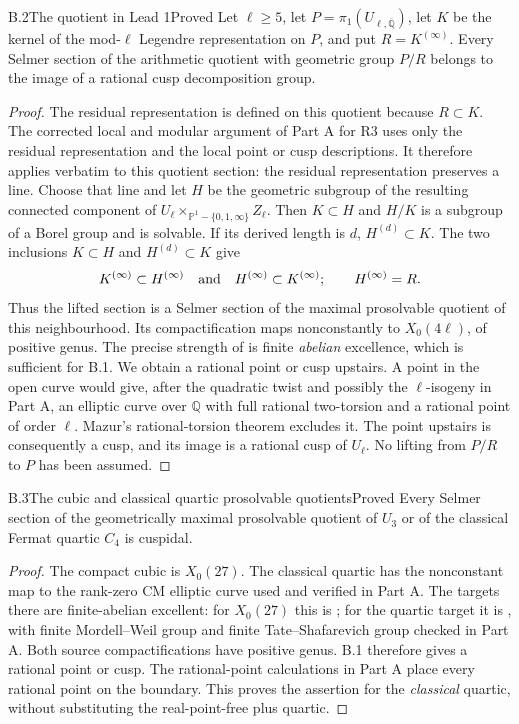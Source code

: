 \begin{statement}{B.2}{The quotient in Lead 1}{Proved}
Let $\ell\geq5$, let $P=\pi_1(U_{\ell,\overline{\mathbb Q}})$,
let $K$ be the kernel of the mod-$\ell$ Legendre representation on $P$,
and put $R=K^{(\infty)}$. Every Selmer section of the arithmetic
quotient with geometric group $P/R$ belongs to the image of a rational
cusp decomposition group.
\end{statement}
\begin{proof}
The residual representation is defined on this quotient because
$R\subset K$. The corrected local and modular argument of Part A for
R3 uses only the residual representation and the local point or cusp
descriptions. It therefore applies verbatim to this quotient section:
the residual representation preserves a line. Choose that line and
let $H$ be the geometric subgroup of the resulting connected component
of $U_\ell\times_{\mathbb P^1-\{0,1,\infty\}} Z_\ell$. Then
$K\subset H$ and $H/K$ is a subgroup of a Borel group and is solvable.
If its derived length is $d$, $H^{(d)}\subset K$. The two inclusions
$K\subset H$ and $H^{(d)}\subset K$ give
\[
 K^{(\infty)}\subset H^{(\infty)}
 \quad\hbox{and}\quad
 H^{(\infty)}\subset K^{(\infty)};
 \qquad H^{(\infty)}=R.
\]
Thus the lifted section is a Selmer section of the maximal prosolvable
quotient of this neighbourhood. Its compactification maps
nonconstantly to $X_0(4\ell)$, of positive genus. The precise strength
of \citet[Corollary 8.8]{AMStoll2007} is finite \emph{abelian}
excellence, which is sufficient for B.1. We obtain a rational point or
cusp upstairs. A point in the open curve would give, after the quadratic
twist and possibly the $\ell$-isogeny in Part A, an elliptic curve over
$\mathbb Q$ with full rational two-torsion and a rational point of
order $\ell$. Mazur's rational-torsion theorem excludes it. The point
upstairs is consequently a cusp, and its image is a rational cusp of
$U_\ell$. No lifting from $P/R$ to $P$ has been assumed.
\end{proof}

\begin{statement}{B.3}{The cubic and classical quartic prosolvable quotients}{Proved}
Every Selmer section of the geometrically maximal prosolvable quotient
of $U_3$ or of the classical Fermat quartic $C_4$ is cuspidal.
\end{statement}
\begin{proof}
The compact cubic is $X_0(27)$. The classical quartic has the
nonconstant map to the rank-zero CM elliptic curve used and verified in
Part A. The targets there are finite-abelian excellent: for $X_0(27)$
this is \citet[Corollary 8.8]{AMStoll2007}; for the quartic target it
is \citet[Theorem 8.6]{AMStoll2007}, with finite Mordell--Weil group
and finite Tate--Shafarevich group checked in Part A. Both source
compactifications have positive genus. B.1 therefore gives a rational
point or cusp. The rational-point calculations in Part A place every
rational point on the boundary. This proves the assertion for the
\emph{classical} quartic, without substituting the real-point-free plus
quartic.
\end{proof}

